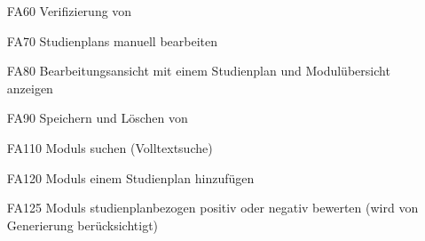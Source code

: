 \begin{itemize}[nosep]
\begin{itemize}[nosep]
				\item \glspl{Nutzer-Zielfunktion}
				\begin{itemize}[nosep]
					\item \gls{ECTS-Punkte}-Minimierung
					\item möglichst schneller Studienabschluss
				\end{itemize}
			\end{itemize}
		\item [FA60] \gls{Verifizierung} von 
		\item [FA70] \glspl{Studienplan} manuell bearbeiten
		\item[FA80] Bearbeitungsansicht mit einem \gls{Studienplan} und Modulübersicht anzeigen  
		\item [FA90]Speichern und Löschen von 	
		\item[FA110] \glspl{Modul} suchen (Volltextsuche)
		\item[FA120] \glspl{Modul} einem \gls{Studienplan} hinzufügen
		\item[FA125] \glspl{Modul} studienplanbezogen positiv oder negativ bewerten (wird von \gls{Generierung} berücksichtigt)
		\end{itemize}
